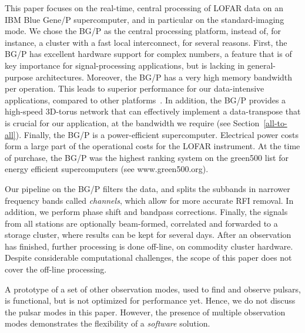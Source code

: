 \documentclass{sig-alternate}
\begin{document}
This paper focuses on the real-time, central processing of LOFAR data
on an IBM Blue Gene/P supercomputer, and in particular on the
standard-imaging mode.  We chose the BG/P as the central processing
platform, instead of, for instance, a cluster with a fast local
interconnect, for several reasons.
First, the BG/P has excellent hardware
support for complex numbers, a feature that is of key
importance for signal-processing applications, but is lacking in
general-purpose architectures. 
Moreover, the BG/P has a very high
memory bandwidth per operation. This leads to superior performance for our
data-intensive applications, compared to other platforms~\cite{Nieuwpoort:09}.
In addition, the BG/P provides a high-speed 3D-torus network that can
effectively implement a data-transpose that is crucial for our
application, at the bandwidth we require (see Section~\ref{all-to-all}). 
Finally, the BG/P is a power-efficient supercomputer.
Electrical power costs form a large part of the operational costs for
the LOFAR instrument.  At the time of purchase, the BG/P was the highest
ranking system on the green500 list for energy
efficient supercomputers (see www.green500.org). 

Our pipeline on the BG/P filters the data, and splits the subbands in narrower frequency bands called
\emph{channels}, which allow for more accurate RFI removal.
In addition, we perform phase shift and bandpass corrections.
Finally, the signals from all stations are optionally beam-formed,
correlated and forwarded to a storage cluster, where results can be
kept for several days. 
After an observation has finished, further processing is done off-line, on
commodity cluster hardware. 
Despite considerable computational challenges, the scope of this paper does not cover
the off-line processing.

A prototype of a set of other observation modes, used to find and observe
pulsars, is functional, but is not optimized for performance yet.
Hence, we do not discuss the pulsar modes in this paper.
However, the presence of multiple observation modes demonstrates the
flexibility of a \emph{software\/} solution.
\end{document}
